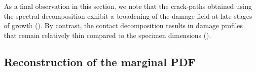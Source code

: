 As a final observation in this section, we note that the crack-paths obtained using the spectral decomposition exhibit a broadening of the damage field at late stages of growth ().  By contrast, the contact decomposition results in damage profiles that remain relatively thin compared to the specimen dimensions ().


\subsection{Reconstruction of the marginal PDF}
